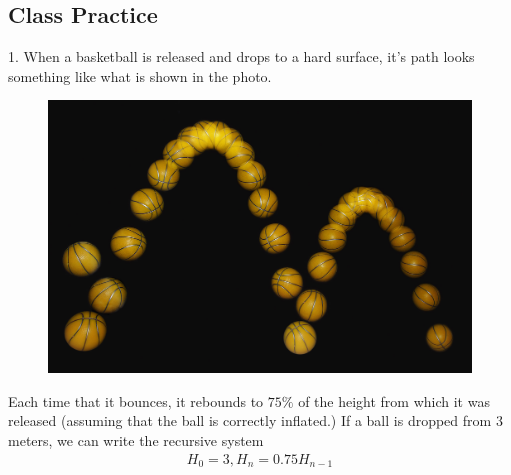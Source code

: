 \documentclass[10pt,]{book}
\theoremstyle{plain}
\theoremstyle{definition}
\theoremstyle{definition}
\theoremstyle{definition}
\numberwithin{equation}{section}
\begin{document}
\subsection[{Class Practice}]{Class Practice}\label{exercises-4}
\begin{exerciselist}
\item[1.]\hypertarget{exercise-18}{}When a basketball is released and drops to a hard surface, it's path looks something like what is shown in the photo.%
\leavevmode%
\begin{figure}
\centering
\includegraphics[width=0.5\linewidth]{src/images/bouncing_ball_strobe_edit.jpg}
\end{figure}
\par
Each time that it bounces, it rebounds to \(75\%\) of the height from which it was released (assuming that the ball is correctly inflated.) If a ball is dropped from \(3\) meters, we can write the recursive system%
%
\begin{gather*}
H_0=3, H_n = 0.75 H_{n-1}
\end{gather*}
\leavevmode%
\begin{figure}
\centering
{
    }
\end{figure}
\end{exerciselist}
\end{document}
